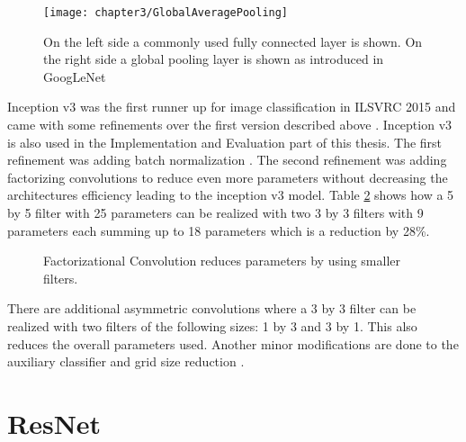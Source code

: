 \begin{figure}[H]
  \centering
  \caption{On the left side a commonly used fully connected layer is shown. On the right side a global pooling layer is shown as introduced in GoogLeNet \cite{ReviewGoogleLeNetv1}}
  \texttt{[image: chapter3/GlobalAveragePooling]}
  \label{fig:GlobalAveragePooling}
\end{figure}

Inception v3 was the first runner up for image classification in ILSVRC 2015 and came with some refinements over the first version described above \cite{szegedy2016rethinking}. Inception v3 is also used in the Implementation and Evaluation part of this thesis. The first refinement was adding batch normalization \cite{ioffe2015batch}. The second refinement was adding factorizing convolutions to reduce even more parameters without decreasing the architectures efficiency leading to the inception v3 model. Table \ref{fig:factorization} shows how a 5 by 5 filter with 25 parameters can be realized with two 3 by 3 filters with 9 parameters each summing up to 18 parameters which is a reduction by 28\%.

\begin{figure}[H]
\centering
\caption{Factorizational Convolution reduces parameters by using smaller filters.}
\label{fig:factorization}
\end{figure}

There are additional asymmetric convolutions where a 3 by 3 filter can be realized with two filters of the following sizes: 1 by 3 and 3 by 1. This also reduces the overall parameters used. Another minor modifications are done to the auxiliary classifier and grid size reduction \cite{szegedy2016rethinking}.

\section{ResNet}

